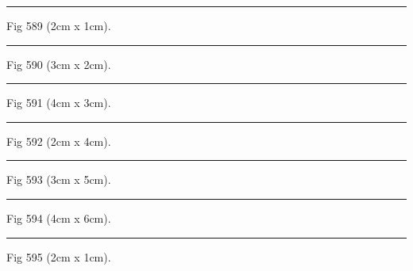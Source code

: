 \documentclass[a4paper,11pt]{article}
\begin{document}
\begin{swarmwrap}%
  \begin{minipage}[t]{2cm}
    \centering
    \rule{\linewidth}{1cm}
    {\footnotesize Fig 589 (2cm x 1cm).}
  \end{minipage}%
\end{swarmwrap}%
\swarmwrapnext
\lipsum[139]%

\begin{swarmwrap}%
  \begin{minipage}[t]{3cm}
    \centering
    \rule{\linewidth}{2cm}
    {\footnotesize Fig 590 (3cm x 2cm).}
  \end{minipage}%
\end{swarmwrap}%
\swarmwrapnext
\lipsum[140]%

\begin{swarmwrap}%
  \begin{minipage}[t]{4cm}
    \centering
    \rule{\linewidth}{3cm}
    {\footnotesize Fig 591 (4cm x 3cm).}
  \end{minipage}%
\end{swarmwrap}%
\swarmwrapnext
\lipsum[141]%

\begin{swarmwrap}%
  \begin{minipage}[t]{2cm}
    \centering
    \rule{\linewidth}{4cm}
    {\footnotesize Fig 592 (2cm x 4cm).}
  \end{minipage}%
\end{swarmwrap}%
\swarmwrapnext
\lipsum[142]%

\begin{swarmwrap}%
  \begin{minipage}[t]{3cm}
    \centering
    \rule{\linewidth}{5cm}
    {\footnotesize Fig 593 (3cm x 5cm).}
  \end{minipage}%
\end{swarmwrap}%
\swarmwrapnext
\lipsum[143]%

\begin{swarmwrap}%
  \begin{minipage}[t]{4cm}
    \centering
    \rule{\linewidth}{6cm}
    {\footnotesize Fig 594 (4cm x 6cm).}
  \end{minipage}%
\end{swarmwrap}%
\swarmwrapnext
\lipsum[144]%

\begin{swarmwrap}%
  \begin{minipage}[t]{2cm}
    \centering
    \rule{\linewidth}{1cm}
    {\footnotesize Fig 595 (2cm x 1cm).}
  \end{minipage}%
\end{swarmwrap}%
\swarmwrapnext
\lipsum[145]%
\end{document}
